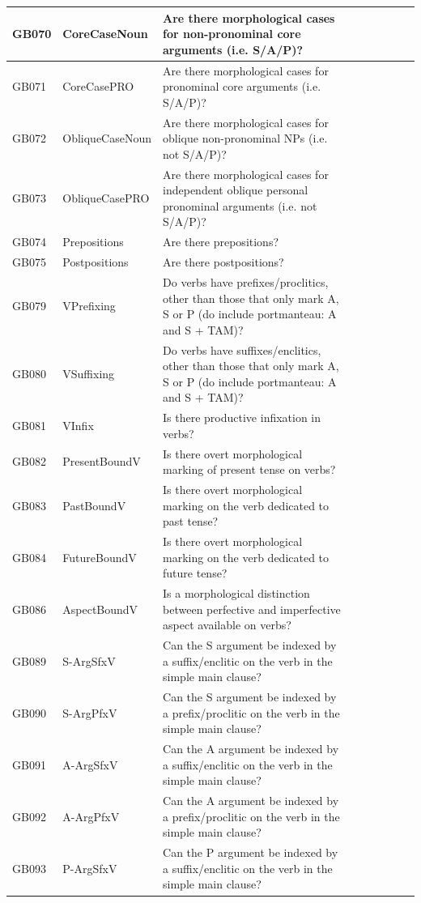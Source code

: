 \documentclass[a4paper,10pt]{article} %
\begin{document}
\begin{landscape}
\begin{longtable}{| l | p{4cm}| p{12cm}|p{2cm}|p{2cm}|p{2cm}|p{2cm}|p{2cm}|p{2cm}|}
GB070 & CoreCaseNoun&Are there morphological cases for non-pronominal core arguments (i.e. S/A/P)?\\ \hline
GB071 & CoreCasePRO&Are there morphological cases for pronominal core arguments (i.e. S/A/P)?\\ \hline
GB072 & ObliqueCaseNoun&Are there morphological cases for oblique non-pronominal NPs (i.e. not S/A/P)?\\ \hline
GB073 & ObliqueCasePRO&Are there morphological cases for independent oblique personal pronominal arguments (i.e. not S/A/P)?\\ \hline
GB074 & Prepositions&Are there prepositions?\\ \hline
GB075 & Postpositions&Are there postpositions?\\ \hline
GB079 & VPrefixing&Do verbs have prefixes/proclitics, other than those that only mark A, S or P (do include portmanteau: A and S + TAM)?\\ \hline
GB080 & VSuffixing&Do verbs have suffixes/enclitics, other than those that only mark A, S or P (do include portmanteau: A and S + TAM)?\\ \hline
GB081 & VInfix&Is there productive infixation in verbs?\\ \hline
GB082 & PresentBoundV&Is there overt morphological marking of present tense on verbs?\\ \hline
GB083 & PastBoundV&Is there overt morphological marking on the verb dedicated to past tense?\\ \hline
GB084 & FutureBoundV&Is there overt morphological marking on the verb dedicated to future tense?\\ \hline
GB086 & AspectBoundV&Is a morphological distinction between perfective and imperfective aspect available on verbs?\\ \hline
GB089 & S-ArgSfxV&Can the S argument be indexed by a suffix/enclitic on the verb in the simple main clause?\\ \hline
GB090 & S-ArgPfxV&Can the S argument be indexed by a prefix/proclitic on the verb in the simple main clause?\\ \hline
GB091 & A-ArgSfxV&Can the A argument be indexed by a suffix/enclitic on the verb in the simple main clause?\\ \hline
GB092 & A-ArgPfxV&Can the A argument be indexed by a prefix/proclitic on the verb in the simple main clause?\\ \hline
GB093 & P-ArgSfxV&Can the P argument be indexed by a suffix/enclitic on the verb in the simple main clause?\\ \hline

\end{longtable}
\end{landscape}
\end{document}
